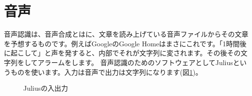 \section{音声}
音声認識は、音声合成とはに、文章を読み上げている音声ファイルからその文章を予想するものです。例えばGoogleのGoogle Homeはまさにこれです。「1時間後に起こして」と声を発すると、内部でそれが文字列に変されます。その後その文字列をしてアラームをします。
音声認識のためのソフトウェアとしてJuliusというものを使います。入力は音声で出力は文字列になります(図\ref{Juliusの入出力})。

\begin{figure}[H]
\begin{center}
    
    \caption{Juliusの入出力}
    \label{Juliusの入出力}
\end{center}
\end{figure}

\begin{tcolorbox}[title=\useOmetoi]
\begin{enumerate}
\end{enumerate}
\end{tcolorbox}
